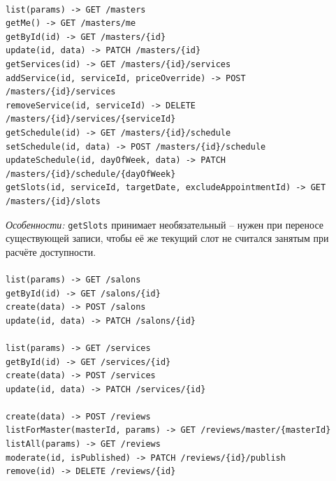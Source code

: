 \paragraph{}
\begin{verbatim}
list(params) -> GET /masters
getMe() -> GET /masters/me
getById(id) -> GET /masters/{id}
update(id, data) -> PATCH /masters/{id}
getServices(id) -> GET /masters/{id}/services
addService(id, serviceId, priceOverride) -> POST /masters/{id}/services
removeService(id, serviceId) -> DELETE /masters/{id}/services/{serviceId}
getSchedule(id) -> GET /masters/{id}/schedule
setSchedule(id, data) -> POST /masters/{id}/schedule
updateSchedule(id, dayOfWeek, data) -> PATCH /masters/{id}/schedule/{dayOfWeek}
getSlots(id, serviceId, targetDate, excludeAppointmentId) -> GET /masters/{id}/slots
\end{verbatim}
\textit{Особенности:} \texttt{getSlots} принимает необязательный
 -- нужен при переносе существующей записи,
чтобы её же текущий слот не считался занятым при расчёте доступности.

\paragraph{}
\begin{verbatim}
list(params) -> GET /salons
getById(id) -> GET /salons/{id}
create(data) -> POST /salons
update(id, data) -> PATCH /salons/{id}
\end{verbatim}

\paragraph{}
\begin{verbatim}
list(params) -> GET /services
getById(id) -> GET /services/{id}
create(data) -> POST /services
update(id, data) -> PATCH /services/{id}
\end{verbatim}

\paragraph{}
\begin{verbatim}
create(data) -> POST /reviews
listForMaster(masterId, params) -> GET /reviews/master/{masterId}
listAll(params) -> GET /reviews
moderate(id, isPublished) -> PATCH /reviews/{id}/publish
remove(id) -> DELETE /reviews/{id}
\end{verbatim}

